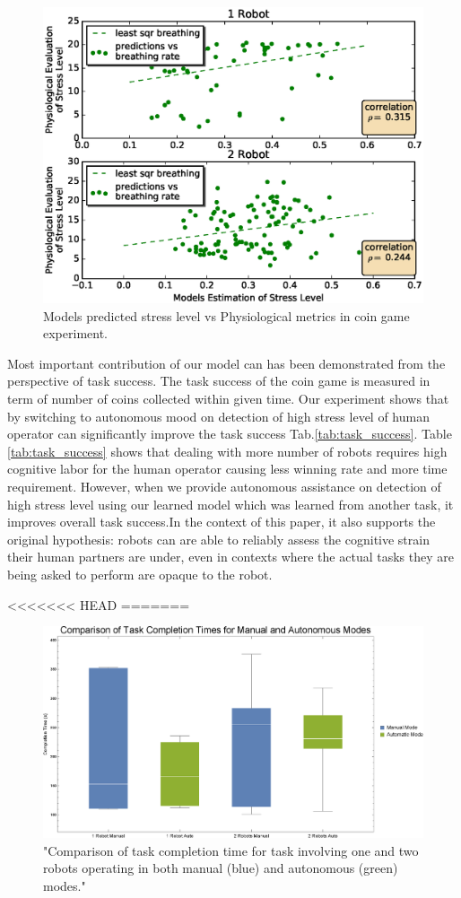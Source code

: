 \documentclass{sig-alternate}
\begin{document}
\begin{figure}  
\centering
\includegraphics[width=.5\textwidth]{prediction_vs_b_p_2.eps}
\caption{Models predicted stress level vs Physiological metrics in coin game experiment.}
\label{fig:pred_phy}
\end{figure}

Most important contribution of our model can has been demonstrated from the perspective of task success. The task success of the coin game is measured in term of number of coins collected within given time. Our experiment shows that by switching to autonomous mood on detection of high stress level of human operator can significantly improve the task success Tab.\ref{tab:task_success}. Table \ref{tab:task_success} shows that dealing with more number of robots requires high cognitive labor for the human operator causing less winning rate and more time requirement. However, when we provide autonomous assistance on detection of high stress level using our learned model which was learned from another task, it improves overall task success.In the context of this paper, it also supports the original hypothesis: robots can are able to reliably assess the cognitive strain their human partners are under, even in contexts where the actual tasks they are being asked to perform are opaque to the robot.

<<<<<<< HEAD
=======
\begin{figure}
\centering
\includegraphics[width=.5\textwidth]{BoxWiskerTimesCompMaualVsAuto.eps}
\caption{"Comparison of task completion time for task involving one and two robots operating in both manual (blue) and autonomous (green) modes."}
\label{fig:BoxWiskersTimeComp}
\end{figure}
\end{document}
